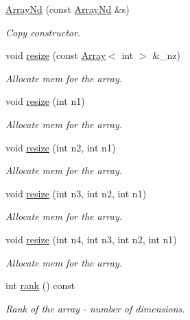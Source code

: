 \begin{DoxyCompactItemize}
\mbox{\hyperlink{classADAT_1_1ArrayNd_a8aec6c75f499b938b8702d4eab1699b8}{Array\+Nd}} (const \mbox{\hyperlink{classADAT_1_1ArrayNd}{Array\+Nd}} \&s)
\begin{DoxyCompactList}\small\item\em Copy constructor. \end{DoxyCompactList}\item 
void \mbox{\hyperlink{classADAT_1_1ArrayNd_afcf13cf80c4cb861316d1ad55601818e}{resize}} (const \mbox{\hyperlink{classXMLArray_1_1Array}{Array}}$<$ int $>$ \&\+\_\+nz)
\begin{DoxyCompactList}\small\item\em Allocate mem for the array. \end{DoxyCompactList}\item 
void \mbox{\hyperlink{classADAT_1_1ArrayNd_a31eb805d0f039712a9b83609dd828d91}{resize}} (int n1)
\begin{DoxyCompactList}\small\item\em Allocate mem for the array. \end{DoxyCompactList}\item 
void \mbox{\hyperlink{classADAT_1_1ArrayNd_ac66a29c373d99ae8ead2344c1024489e}{resize}} (int n2, int n1)
\begin{DoxyCompactList}\small\item\em Allocate mem for the array. \end{DoxyCompactList}\item 
void \mbox{\hyperlink{classADAT_1_1ArrayNd_a1b042ead88dae6696d7a0c77fd01ddfa}{resize}} (int n3, int n2, int n1)
\begin{DoxyCompactList}\small\item\em Allocate mem for the array. \end{DoxyCompactList}\item 
void \mbox{\hyperlink{classADAT_1_1ArrayNd_a2a54d490a8a0a7aa9aeeaee6e6a84b90}{resize}} (int n4, int n3, int n2, int n1)
\begin{DoxyCompactList}\small\item\em Allocate mem for the array. \end{DoxyCompactList}\item 
int \mbox{\hyperlink{classADAT_1_1ArrayNd_a3f681a80aee7e76cc959431f45d931f8}{rank}} () const
\begin{DoxyCompactList}\small\item\em Rank of the array -\/ number of dimensions. \end{DoxyCompactList}\item 

\end{DoxyCompactItemize}
